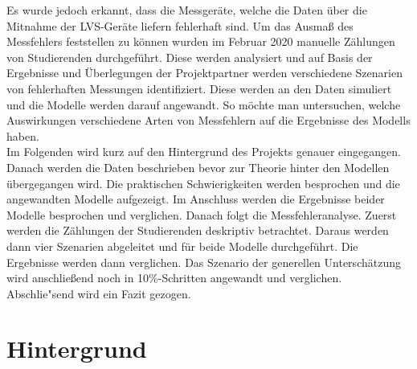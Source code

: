 \documentclass[12pt]{scrreprt}
\begin{document}
Es wurde jedoch erkannt, dass die Messgeräte, welche die Daten über die Mitnahme der LVS-Geräte liefern fehlerhaft sind. Um das Ausmaß des Messfehlers feststellen zu können wurden im Februar 2020 manuelle Zählungen von Studierenden durchgeführt. Diese werden analysiert und auf Basis der Ergebnisse und Überlegungen der Projektpartner werden verschiedene Szenarien von fehlerhaften Messungen identifiziert. Diese werden an den Daten simuliert und die Modelle werden darauf angewandt. So möchte man untersuchen, welche Auswirkungen verschiedene Arten von Messfehlern auf die Ergebnisse des Modells haben. \\
Im Folgenden wird kurz auf den Hintergrund des Projekts genauer eingegangen. Danach werden die Daten beschrieben bevor zur Theorie hinter den Modellen übergegangen wird. Die praktischen Schwierigkeiten werden besprochen und die angewandten Modelle aufgezeigt. Im Anschluss werden die Ergebnisse beider Modelle besprochen und verglichen. Danach folgt die Messfehleranalyse. Zuerst werden die Zählungen der Studierenden deskriptiv betrachtet. Daraus werden dann vier Szenarien abgeleitet und für beide Modelle durchgeführt. Die Ergebnisse werden dann verglichen. Das Szenario der generellen Unterschätzung wird anschließend noch in 10\%-Schritten angewandt und verglichen. Abschlie"send wird ein Fazit gezogen.


\chapter{Hintergrund}
\end{document}
